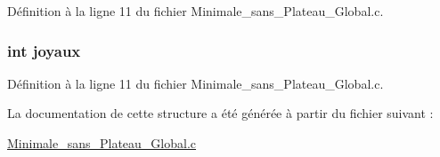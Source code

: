 Définition à la ligne 11 du fichier Minimale\-\_\-sans\-\_\-\-Plateau\-\_\-\-Global.\-c.

\hypertarget{structt__richesses_a2b6ab4591114fab25daaf1d15385ba2b}{
\subsubsection[{joyaux}]{\setlength{\rightskip}{0pt plus 5cm}int joyaux}}\label{structt__richesses_a2b6ab4591114fab25daaf1d15385ba2b}


Définition à la ligne 11 du fichier Minimale\-\_\-sans\-\_\-\-Plateau\-\_\-\-Global.\-c.



La documentation de cette structure a été générée à partir du fichier suivant \-:\begin{DoxyCompactItemize}
\item 
\hyperlink{_minimale__sans___plateau___global_8c}{Minimale\-\_\-sans\-\_\-\-Plateau\-\_\-\-Global.\-c}\end{DoxyCompactItemize}
